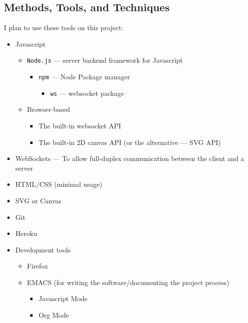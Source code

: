 \documentclass[11pt]{article}
\begin{document}
\subsection{Methods, Tools, and Techniques}
\label{sec:orgad090a5}
I plan to use these tools on this project:
\begin{itemize}
\item Javascript
\begin{itemize}
\item \texttt{Node.js} --- server backend framework for Javascript
\begin{itemize}
\item \texttt{npm} --- Node Package manager
\begin{itemize}
\item \texttt{ws} --- websocket package
\end{itemize}
\end{itemize}
\item Browser-based
\begin{itemize}
\item The built-in websocket API
\item The built-in 2D canvas API (or the alternative --- SVG API)
\end{itemize}
\end{itemize}
\item WebSockets --- To allow full-duplex communication between the client and a server
\item HTML/CSS (minimal usage)
\item SVG or Canvas
\item Git
\item Heroku
\item Development tools
\begin{itemize}
\item Firefox
\item EMACS (for writing the software/documenting the project process)
\begin{itemize}
\item Javascript Mode
\item Org Mode
\end{itemize}
\end{itemize}
\end{itemize}
\end{document}
